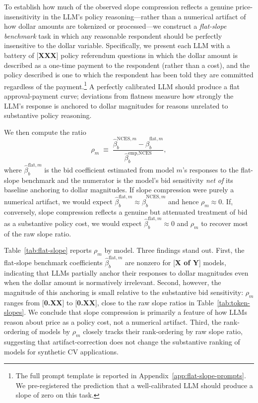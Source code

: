 \documentclass[12pt]{article}
\begin{document}
To establish how much of the observed slope compression reflects a genuine price-insensitivity in the LLM's policy reasoning---rather than a numerical artifact of how dollar amounts are tokenized or processed---we construct a \emph{flat-slope benchmark} task in which any reasonable respondent should be perfectly insensitive to the dollar variable. Specifically, we present each LLM with a battery of [\textbf{XXX}] policy referendum questions in which the dollar amount is described as a one-time payment to the respondent (rather than a cost), and the policy described is one to which the respondent has been told they are committed regardless of the payment.\footnote{The full prompt template is reported in Appendix~\ref{app:flat-slope-prompts}. We pre-registered the prediction that a well-calibrated LLM should produce a slope of zero on this task.} A perfectly calibrated LLM should produce a flat approval-payment curve; deviations from flatness measure how strongly the LLM's response is anchored to dollar magnitudes for reasons unrelated to substantive policy reasoning.

We then compute the ratio
\begin{equation}
    \rho_m \;\equiv\; \frac{\hat{\beta}_b^{\text{NCES}, m} - \hat{\beta}_b^{\text{flat}, m}}{\hat{\beta}_b^{\text{emp,NCES}}},
    \label{eq:rho}
\end{equation}
where $\hat{\beta}_b^{\text{flat}, m}$ is the bid coefficient estimated from model $m$'s responses to the flat-slope benchmark and the numerator is the model's bid sensitivity \emph{net of} its baseline anchoring to dollar magnitudes. If slope compression were purely a numerical artifact, we would expect $\hat{\beta}_b^{\text{flat}, m} \approx \hat{\beta}_b^{\text{NCES}, m}$ and hence $\rho_m \approx 0$. If, conversely, slope compression reflects a genuine but attenuated treatment of bid as a substantive policy cost, we would expect $\hat{\beta}_b^{\text{flat}, m} \approx 0$ and $\rho_m$ to recover most of the raw slope ratio.

Table~\ref{tab:flat-slope} reports $\rho_m$ by model. Three findings stand out. First, the flat-slope benchmark coefficients $\hat{\beta}_b^{\text{flat}, m}$ are nonzero for [\textbf{X of Y}] models, indicating that LLMs partially anchor their responses to dollar magnitudes even when the dollar amount is normatively irrelevant. Second, however, the magnitude of this anchoring is small relative to the substantive bid sensitivity: $\rho_m$ ranges from [\textbf{0.XX}] to [\textbf{0.XX}], close to the raw slope ratios in Table~\ref{tab:token-slopes}. We conclude that slope compression is primarily a feature of how LLMs reason about price as a policy cost, not a numerical artifact. Third, the rank-ordering of models by $\rho_m$ closely tracks their rank-ordering by raw slope ratio, suggesting that artifact-correction does not change the substantive ranking of models for synthetic CV applications.
\end{document}
